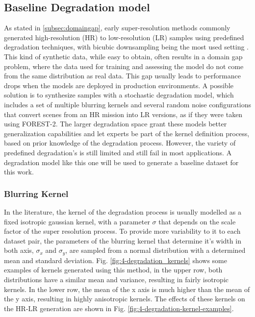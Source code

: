     \subsection{Baseline Degradation model} \label{subsec:baseline_degradation_model}

        As stated in \ref{subsec:domaingap}, early super-resolution methods commonly generated high-resolution (HR) to low-resolution (LR) samples using predefined degradation techniques, with bicubic downsampling being the most used setting \cite{zhang2018residual}.
        This kind of synthetic data, while easy to obtain, often results in a domain gap problem, where the data used for training and assessing the model do not come from the same distribution as real data.
        This gap usually leads to performance drops when the models are deployed in production environments.
        A possible solution is to synthesize samples with a stochastic degradation model, which includes a set of multiple blurring kernels and several random noise configurations that convert scenes from an HR mission into LR versions, as if they were taken using FOREST-2.
        The larger degradation space grant these models better generalization capabilities and let experts be part of the kernel definition process, based on prior knowledge of the degradation process.
        However, the variety of predefined degradation's is still limited and still fail in most applications. A degradation model like this one will be used to generate a baseline dataset for this work.
        

        \subsubsection{Blurring Kernel}

        In the literature, the kernel of the degradation process is usually modelled as a fixed isotropic gaussian kernel, with a parameter $\sigma$ that depends on the scale factor of the super resolution process.
        To provide more variability to it to each dataset pair, the parameters of the blurring kernel that determine it's width in both axis, $\sigma_x$ and $\sigma_y$, are sampled from a normal distribution with a determined mean and standard deviation. Fig. \ref{fig:4-degradation_kernels} shows some examples of kernels generated using this method, in the upper row, both distributions have a similar mean and variance, resulting in fairly isotropic kernels. In the lower row, the mean of the x axis is much higher than the mean of the y axis, resulting in highly anisotropic kernels. The effects of these kernels on the HR-LR generation are shown in Fig. \ref{fig:4-degradation-kernel-examples}.



